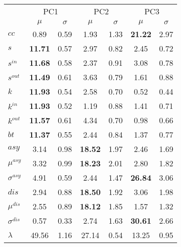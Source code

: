 \begin{center}
\begin{tabular}{| l | c | c | c | c | c | c |}\cline{2-7}
\multicolumn{1}{c|}{} & \multicolumn{2}{c|}{PC1}          & \multicolumn{2}{c|}{PC2} & \multicolumn{2}{c|}{PC3}  \\\cline{2-7}\multicolumn{1}{c|}{} & $\mu$            & $\sigma$ & $\mu$         & $\sigma$ & $\mu$ & $\sigma$  \\\hline
$cc$ &                     0.89  & 0.59  & 1.93  & 1.33  & {\bf 21.22}  & 2.97 \\\hline
$s$ &              {\bf 11.71}  & 0.57  & 2.97  & 0.82  & 2.45  & 0.72 \\
$s^{in}$ &         {\bf 11.68}  & 0.58  & 2.37  & 0.91  & 3.08  & 0.78 \\
$s^{out}$ &        {\bf 11.49}  & 0.61  & 3.63  & 0.79  & 1.61  & 0.88 \\
$k$ &              {\bf 11.93}  & 0.54  & 2.58  & 0.70  & 0.52  & 0.44 \\
$k^{in}$ &         {\bf 11.93}  & 0.52  & 1.19  & 0.88  & 1.41  & 0.71 \\
$k^{out}$ &        {\bf 11.57}  & 0.61  & 4.34  & 0.70  & 0.98  & 0.66 \\
$bt$ &             {\bf 11.37}  & 0.55  & 2.44  & 0.84  & 1.37  & 0.77 \\\hline
$asy$ &                    3.14  & 0.98  & {\bf 18.52}  & 1.97  & 2.46  & 1.69 \\
$\mu^{asy}$              & 3.32  & 0.99  & {\bf 18.23}  & 2.01  & 2.80  & 1.82 \\
$\sigma^{asy}$           & 4.91  & 0.59  & 2.44  & 1.47  & {\bf 26.84}  & 3.06 \\
$dis$                    & 2.94  & 0.88  & {\bf 18.50}  & 1.92  & 3.06  & 1.98 \\
$\mu^{dis}$              & 2.55  & 0.89  & {\bf 18.12}  & 1.85  & 1.57  & 1.32 \\
	$\sigma^{dis}$           & 0.57  & 0.33  & 2.74  & 1.63  & {\bf 30.61}  & 2.66 \\\hline\hline
$\lambda$                & 49.56 & 1.16  & 27.14  & 0.54  & 13.25  & 0.95 \\
\hline\end{tabular}
\end{center}
